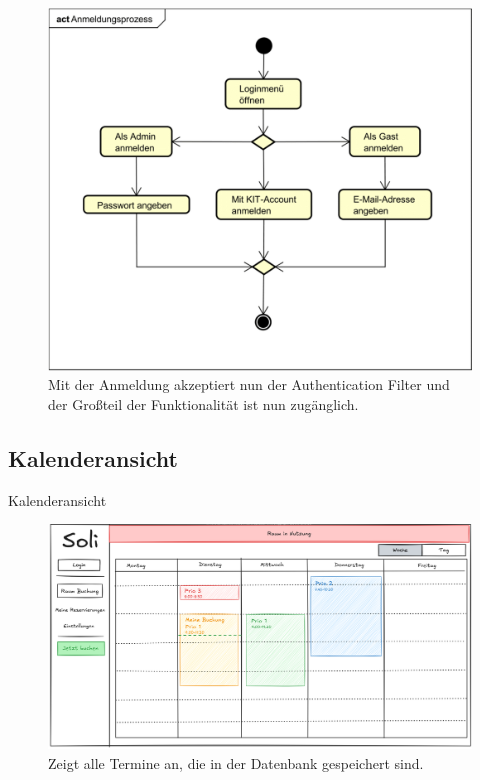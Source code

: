 \documentclass{sdqbeamer}
\begin{document}
\begin{frame}
    \begin{figure}
        \centering
        \includegraphics[width=\textwidth]{pictures/figures/activity/anmeldeprozess}
        \caption{Mit der Anmeldung akzeptiert nun der Authentication Filter und der Großteil der Funktionalität ist nun zugänglich.}
        \label{fig:loginprozess}
    \end{figure}
\end{frame}

\subsection{Kalenderansicht}
\begin{frame}{Kalenderansicht}
    \begin{figure}
        \centering
        \includegraphics[width=\textwidth]{pictures/figures/ui/startseite}
        \caption{Zeigt alle Termine an, die in der Datenbank gespeichert sind.}
        \label{fig:kalender}
    \end{figure}
\end{frame}
\end{document}
